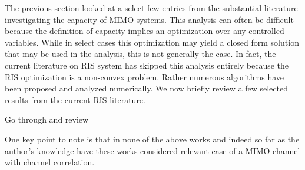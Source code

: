 The previous section looked at a select few entries from the substantial literature investigating the capacity of MIMO systems.
This analysis can often be difficult because the definition of capacity implies an optimization over any controlled variables. 
While in select cases this optimization may yield a closed form solution that may be used in the analysis, this is not generally the case. 
In fact, the current literature on RIS system has skipped this analysis entirely because the RIS optimization is a non-convex problem. Rather 
numerous algorithms have been proposed and analyzed numerically. We now briefly review a few selected results from the current RIS literature. 
\par
Go through and review
\par
One key point to note is that in none of the above works and indeed so far as the author's knowledge have these works considered relevant case of a MIMO channel with channel correlation. 